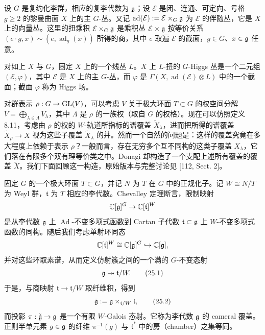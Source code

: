设 $G$ 是复约化李群，相应的复李代数为 $\mathfrak{g}$；设 $\mathcal{E}$ 是闭、连通、可定向、亏格 $g\ge2$ 的黎曼曲面 $X$ 上的主 $G$-丛。又记 $\operatorname{ad}(\mathcal{E}):=\mathcal{E}\times_G\mathfrak{g}$ 为 $\mathcal{E}$ 的伴随丛，它是 $X$ 上的向量丛。这里的扭乘积 $\mathcal{E}\times_G\mathfrak{g}$ 是乘积丛 $\mathcal{E}\times\mathfrak{g}$ 按等价关系 $(e\cdot g,x)\sim(e,\operatorname{ad}_g(x))$ 所得的商，其中 $e$ 取遍 $\mathcal{E}$ 的截面，$g\in G$、$x\in\mathfrak{g}$ 任意。

\begin{definition}[25.1] 对如上 $X$ 与 $G$，固定 $X$ 上的一个线丛 $L$。$X$ 上 $L$-扭的 $G$-Higgs 丛是一个二元组 $(\mathcal{E},\varphi)$，其中 $\mathcal{E}$ 是 $X$ 上的主 $G$-丛，而 $\varphi$ 是 $\Gamma(X,\operatorname{ad}(\mathcal{E})\otimes L)$ 中的一个截面；截面 $\varphi$ 称为 Higgs 场。\end{definition}

\begin{remark}[25.2] 对群表示 $\rho:G\to\operatorname{GL}(V)$，可以考虑 $V$ 关于极大环面 $T\subset G$ 的权空间分解 $V=\bigoplus_{\lambda\in\Lambda}V_\lambda$，其中 $\Lambda$ 是 $\rho$ 的一族权（取自 $G$ 的权格）。现在可以仿照定义 8.11，考虑由 $\rho$ 的权的 $W$-轨道所指标的谱覆盖 $\tilde X_\lambda$，进而把所得的谱覆盖 $\tilde X_\rho\to X$ 视为这些子覆盖 $\tilde X_\lambda$ 的并。然而一个自然的问题是：这样的覆盖究竟在多大程度上依赖于表示 $\rho$？一般而言，存在无穷多个互不同构的这类子覆盖 $X_\lambda$，它们落在有限多个双有理等价类之中。Donagi 却构造了一个支配上述所有覆盖的覆盖 $\tilde X$。我们下面回顾这一构造，原始版本与完整讨论见 [112, Sect. 2]。\end{remark}


固定 $G$ 的一个极大环面 $T\subset G$，并记 $N$ 为 $T$ 在 $G$ 中的正规化子。记 $W\cong N/T$ 为 Weyl 群，$\mathfrak{t}$ 为 $T$ 相应的李代数。Chevalley 定理断言，限制映射
\[
\mathbb{C}[\mathfrak{g}]^G\to\mathbb{C}[\mathfrak{t}]^W
\]
是从李代数 $\mathfrak{g}$ 上 $\operatorname{Ad}$-不变多项式函数到 Cartan 子代数 $\mathfrak{t}\subset\mathfrak{g}$ 上 $W$-不变多项式函数的同构。随后我们考虑单射环同态
\[
\mathbb{C}[\mathfrak{t}]^W\cong\mathbb{C}[\mathfrak{g}]^G\hookrightarrow\mathbb{C}[\mathfrak{g}],
\]
并对这些环取素谱，从而定义仿射簇之间的一个满的 $G$-不变态射
\begin{equation}
\mathfrak{g}\twoheadrightarrow\mathfrak{t}/W.
\tag{25.1}
\end{equation}
于是，与商映射 $\mathfrak{t}\to\mathfrak{t}/W$ 取纤维积，得到
\begin{equation}
\tilde{\mathfrak{g}}:=\mathfrak{g}\times_{\mathfrak{t}/W}\mathfrak{t},
\tag{25.2}
\end{equation}
而投影 $\pi:\tilde{\mathfrak{g}}\to\mathfrak{g}$ 是一个有限 $W$-Galois 态射。它称为李代数 $\mathfrak{g}$ 的 cameral 覆盖。正则半单元素 $g\in\mathfrak{g}$ 的纤维 $\pi^{-1}(g)$ 与 $\mathfrak{t}^*$ 中的房（chamber）之集等同。

